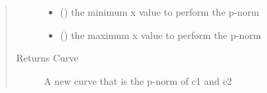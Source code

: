 \documentclass[letterpaper,10pt,english]{sphinxmanual}
\begin{document}
\begin{fulllineitems}
\begin{quote}
\begin{description}
\begin{itemize}
\item {} 
 () \textendash{} the minimum x value to perform the p-norm

\item {} 
 () \textendash{} the maximum x value to perform the p-norm

\end{itemize}

\item[{Returns Curve}] \leavevmode
A new curve that is the p-norm of c1 and c2

\end{description}\end{quote}

\end{fulllineitems}

\end{document}
